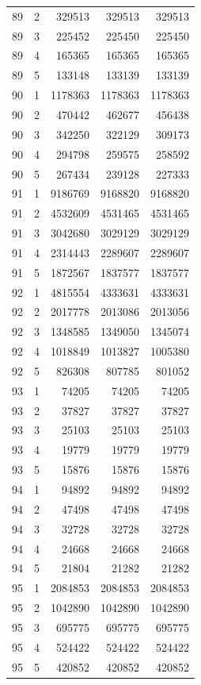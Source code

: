 \begin{longtable}{rrrrr}
89 & 2 & 329513 & 329513 & 329513 \\
89 & 3 & 225452 & 225450 & 225450 \\
89 & 4 & 165365 & 165365 & 165365 \\
89 & 5 & 133148 & 133139 & 133139 \\
90 & 1 & 1178363 & 1178363 & 1178363 \\
90 & 2 & 470442 & 462677 & 456438 \\
90 & 3 & 342250 & 322129 & 309173 \\
90 & 4 & 294798 & 259575 & 258592 \\
90 & 5 & 267434 & 239128 & 227333 \\
91 & 1 & 9186769 & 9168820 & 9168820 \\
91 & 2 & 4532609 & 4531465 & 4531465 \\
91 & 3 & 3042680 & 3029129 & 3029129 \\
91 & 4 & 2314443 & 2289607 & 2289607 \\
91 & 5 & 1872567 & 1837577 & 1837577 \\
92 & 1 & 4815554 & 4333631 & 4333631 \\
92 & 2 & 2017778 & 2013086 & 2013056 \\
92 & 3 & 1348585 & 1349050 & 1345074 \\
92 & 4 & 1018849 & 1013827 & 1005380 \\
92 & 5 & 826308 & 807785 & 801052 \\
93 & 1 & 74205 & 74205 & 74205 \\
93 & 2 & 37827 & 37827 & 37827 \\
93 & 3 & 25103 & 25103 & 25103 \\
93 & 4 & 19779 & 19779 & 19779 \\
93 & 5 & 15876 & 15876 & 15876 \\
94 & 1 & 94892 & 94892 & 94892 \\
94 & 2 & 47498 & 47498 & 47498 \\
94 & 3 & 32728 & 32728 & 32728 \\
94 & 4 & 24668 & 24668 & 24668 \\
94 & 5 & 21804 & 21282 & 21282 \\
95 & 1 & 2084853 & 2084853 & 2084853 \\
95 & 2 & 1042890 & 1042890 & 1042890 \\
95 & 3 & 695775 & 695775 & 695775 \\
95 & 4 & 524422 & 524422 & 524422 \\
95 & 5 & 420852 & 420852 & 420852 \\

\end{longtable}
